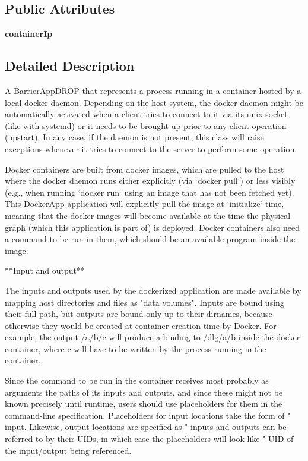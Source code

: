 \subsection*{Public Attributes}
\begin{DoxyCompactItemize}
\item 
\mbox{\label{classdlg_1_1apps_1_1dockerapp_1_1_docker_app_a63b019cbf7ac40c0c45d90bf53b2d10a}} 
{\bfseries container\+Ip}
\end{DoxyCompactItemize}


\subsection{Detailed Description}
\begin{DoxyVerb}A BarrierAppDROP that represents a process running in a container
hosted by a local docker daemon. Depending on the host system, the docker
daemon might be automatically activated when a client tries to connect to
it via its unix socket (like with systemd) or it needs to be brought up
prior to any client operation (upstart). In any case, if the daemon is
not present, this class will raise exceptions whenever it tries to connect
to the server to perform some operation.

Docker containers are built from docker images, which are pulled to the host
where the docker daemon runs either explicitly (via `docker pull`) or less
visibly (e.g., when running `docker run` using an image that has not been
fetched yet). This DockerApp application will explicitly pull the image at
`initialize` time, meaning that the docker images will become available at
the time the physical graph (which this application is part of) is deployed.
Docker containers also need a command to be run in them, which should be
an available program inside the image.

**Input and output**

The inputs and outputs used by the dockerized application are made available
by mapping host directories and files as "data volumes". Inputs are bound
using their full path, but outputs are bound only up to their dirnames,
because otherwise they would be created at container creation time by
Docker. For example, the output /a/b/c will produce a binding to /dlg/a/b
inside the docker container, where c will have to be written by the process
running in the container.

Since the command to be run in the container receives most probably as
arguments the paths of its inputs and outputs, and since these might not be
known precisely until runtime, users should use placeholders for them in the
command-line specification. Placeholders for input locations take the form
of "%
input. Likewise, output locations are specified as "%
inputs and outputs can be referred to by their UIDs, in which case the
placeholders will look like "%
UID of the input/output being referenced.


\end{DoxyVerb}
